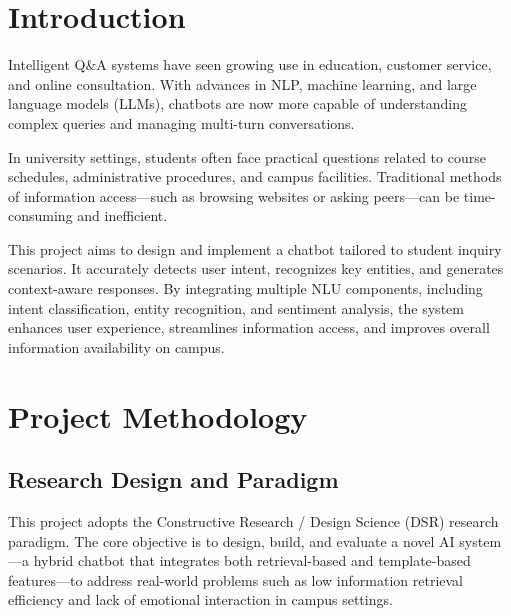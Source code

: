 \documentclass{xum_review}
\begin{document}
\tableofcontents
\newpage
\setcounter{page}{1}

\section{Introduction}

Intelligent Q\&A systems have seen growing use in education, customer service, and online consultation. With advances in
NLP, machine learning, and large language models (LLMs), chatbots are now more capable of understanding complex queries
and managing multi-turn conversations.

In university settings, students often face practical questions related to course schedules, administrative procedures,
and campus facilities. Traditional methods of information access—such as browsing websites or asking peers—can be
time-consuming and inefficient. 

This project aims to design and implement a chatbot tailored to student inquiry scenarios. It accurately detects user
intent, recognizes key entities, and generates context-aware responses. By integrating multiple NLU components,
including intent classification, entity recognition, and sentiment analysis, the system enhances user experience,
streamlines information access, and improves overall information availability on campus.

\section{Project Methodology}

	\subsection{Research Design and Paradigm}

	This project adopts the Constructive Research / Design Science (DSR) research paradigm. The core objective is to design,
	build, and evaluate a novel AI system—a hybrid chatbot that integrates both retrieval-based and template-based
	features—to address real-world problems such as low information retrieval efficiency and lack of emotional interaction
	in campus settings\citep{yang2019hybridretrievalgenerationneuralconversation}.
\end{document}
